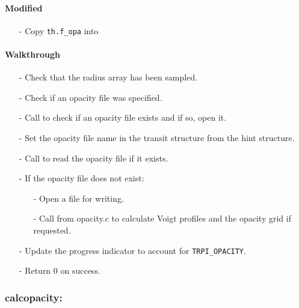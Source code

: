 \documentclass[letterpaper,12pt]{article}
\begin{document}
\paragraph{Modified}
\begin{enumerate}[leftmargin=10pt, noitemsep, parsep=0pt, topsep=0ex]
\item[-] Copy {\tt th.f\_opa} into 
\end{enumerate}

\paragraph{Walkthrough}
\begin{enumerate}[leftmargin=10pt, noitemsep, parsep=0pt, topsep=0ex]
\item[-] Check that the radius array has been sampled.
\item[-] Check if an opacity file was specified.
\item[-] Call  to check if an opacity file exists and if so, open it.
\item[-] Set the opacity file name in the transit structure from the hint structure.
\item[-] Call  to read the opacity file if it exists.
\item[-] If the opacity file does not exist:
\begin{enumerate}[leftmargin=10pt, noitemsep, parsep=0pt, topsep=0ex]
\item[-] Open a file for writing.
\item[-] Call  from opacity.c to calculate Voigt profiles and the opacity grid if requested.
\end{enumerate}
\item[-] Update the progress indicator to account for {\tt TRPI\_OPACITY}.
\item[-] Return 0 on success.
\end{enumerate}

\subsubsection{calcopacity:}
\end{document}

